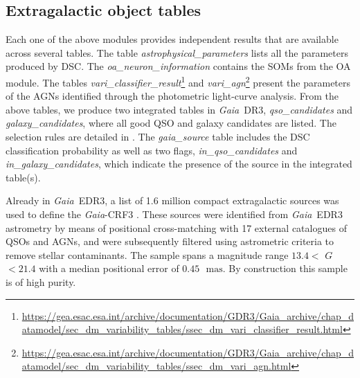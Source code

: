 \documentclass[longauth]{aa}
\makeatletter
\providecommand\gmag{\ensuremath{G}\xspace}
\providecommand{\mas}{\ensuremath{\,\mathrm{mas}}\xspace}
\newcommand\gaia{\textit{Gaia}\xspace}
\providecommand\gedrthree{\textit{Gaia}~EDR3\xspace}
\providecommand\gdrthree{\textit{Gaia}~DR3\xspace}
\providecommand\gedr[1]{\textit{Gaia}~EDR#1\xspace}
\providecommand{\linktodoc}{https://gea.esac.esa.int/archive/documentation/GDR3}
\providecommand{\linktotableap}[1]{\url{\linktodoc/Gaia_archive/chap_datamodel/sec_dm_astrophysical_parameter_tables/ssec_dm_#1.html}} %
\providecommand{\varitable}[1]{\url{\linktodoc/Gaia_archive/chap_datamodel/sec_dm_variability_tables/ssec_dm_#1.html}}%
\DeclareRobustCommand*{\fieldName}[1]{%
  \begingroup\@fieldName\scantokens{\texttt{\small {#1}}\noexpand}\endgroup}
\makeatother
\begin{document}
\subsection{Extragalactic object  tables}
Each one of the above modules provides independent results that are available across several tables. The table \textit{astrophysical\_parameters}
lists all the parameters produced by  DSC. %
The \textit{oa\_neuron\_information}
contains the SOMs from the OA module. The tables \textit{vari\_classifier\_result}\footnote{\varitable{vari_classifier_result}}
and \textit{vari\_agn}\footnote{\varitable{vari_agn}}
present the parameters of the AGNs identified through the photometric light-curve analysis.
From the above tables, we produce two integrated tables in \gdrthree,   \textit{qso\_candidates}
and \textit{galaxy\_candidates},
where all good QSO and galaxy candidates are listed.
The selection rules are detailed in \cite{DR3-DPACP-101}.
The \textit{gaia\_source}
table includes the DSC classification probability as well as two flags, \textit{in\_qso\_candidates}
and \textit{in\_galaxy\_candidates},
which indicate the presence of the source in the integrated table(s).

Already in \gedr{3}, a list of 1.6 million compact extragalactic sources was used to define the \gaia-CRF3 \citep[][]{EDR3-DPACP-133}. These sources were identified from \gedrthree astrometry by means of positional cross-matching with 17 external catalogues of QSOs and AGNs, and were subsequently filtered using astrometric criteria to remove stellar contaminants. The sample spans a magnitude range $13.4<$ \gmag$<21.4$ with a median positional error of $0.45$~\mas. By construction this sample is of high purity. 
\end{document}
